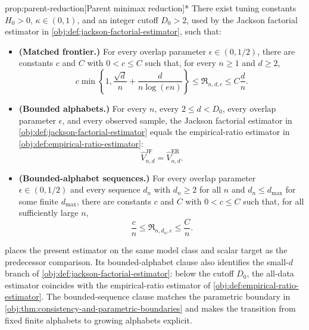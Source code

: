 \begin{propositionv}{prop:parent-reduction}[Parent minimax reduction]*
There exist tuning constants \(H_0>0\), \(\kappa\in(0,1)\), and an integer cutoff \(D_0>2\), used by the Jackson factorial estimator in \cref{obj:def:jackson-factorial-estimator}, such that:
\begin{itemize}
\item \textbf{(Matched frontier.)} For every overlap parameter \(\epsilon\in(0,1/2)\), there are constants \(c\) and \(C\) with \(0<c\leq C\) such that, for every \(n\geq1\) and \(d\geq2\),
\[
c\min\left\{1,\frac{\sqrt d}{n}+\frac{d}{n\log(en)}\right\}
\leq
\mathfrak R_{n,d,\epsilon}
\leq
C\frac{d}{n}.
\]
\item \textbf{(Bounded alphabets.)} For every \(n\), every \(2\leq d<D_0\), every overlap parameter \(\epsilon\), and every observed sample, the Jackson factorial estimator in \cref{obj:def:jackson-factorial-estimator} equals the empirical-ratio estimator in \cref{obj:def:empirical-ratio-estimator}:
\[
\widehat V_{n,d}^{\mathrm{JF}}=\widehat V_{n,d}^{\mathrm{ER}}.
\]
\item \textbf{(Bounded-alphabet sequences.)} For every overlap parameter \(\epsilon\in(0,1/2)\) and every sequence \(d_n\) with \(d_n\geq2\) for all \(n\) and \(d_n\leq d_{\max}\) for some finite \(d_{\max}\), there are constants \(c\) and \(C\) with \(0<c\leq C\) such that, for all sufficiently large \(n\),
\[
\frac{c}{n}
\leq
\mathfrak R_{n,d_n,\epsilon}
\leq
\frac{C}{n}.
\]
\end{itemize}
\end{propositionv}

 places the present estimator on the same model class and scalar target as the predecessor comparison. Its bounded-alphabet clause also identifies the small-\(d\) branch of \cref{obj:def:jackson-factorial-estimator}: below the cutoff \(D_0\), the all-data estimator coincides with the empirical-ratio estimator of \cref{obj:def:empirical-ratio-estimator}. The bounded-sequence clause matches the parametric boundary in \cref{obj:thm:consistency-and-parametric-boundaries} and makes the transition from fixed finite alphabets to growing alphabets explicit.

